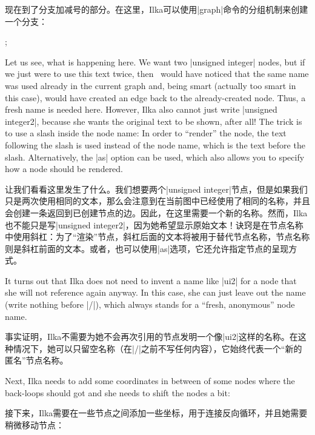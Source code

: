 现在到了分支加减号的部分。在这里，Ilka可以使用|graph|命令的分组机制来创建一个分支：

%
\begin{codeexample}[preamble={\usetikzlibrary{graphs,shapes.misc}}]
\tikz {};
\end{codeexample}
%
Let us see, what is happening here. We want two |unsigned integer| nodes, but
if we just were to use this text twice, then \tikzname\ would have noticed that
the same name was used already in the current graph and, being smart (actually
too smart in this case), would have created an edge back to the already-created
node. Thus, a fresh name is needed here. However, Ilka also cannot just write
|unsigned integer2|, because she wants the original text to be shown, after
all! The trick is to use a slash inside the node name: In order to ``render''
the node, the text following the slash is used instead of the node name, which
is the text before the slash. Alternatively, the |as| option can be used, which
also allows you to specify how a node should be rendered.

让我们看看这里发生了什么。我们想要两个|unsigned integer|节点，但是如果我们只是两次使用相同的文本，那么\tikzname 会注意到在当前图中已经使用了相同的名称，并且会创建一条返回到已创建节点的边。因此，在这里需要一个新的名称。然而，Ilka也不能只是写|unsigned integer2|，因为她希望显示原始文本！诀窍是在节点名称中使用斜杠：为了“渲染”节点，斜杠后面的文本将被用于替代节点名称，节点名称则是斜杠前面的文本。或者，也可以使用|as|选项，它还允许指定节点的呈现方式。

It turns out that Ilka does not need to invent a name like |ui2| for a node
that she will not reference again anyway. In this case, she can just leave out
the name (write nothing before |/|), which always stands for a ``fresh,
anonymous'' node name.

事实证明，Ilka不需要为她不会再次引用的节点发明一个像|ui2|这样的名称。在这种情况下，她可以只留空名称（在|/|之前不写任何内容），它始终代表一个“新的匿名”节点名称。

Next, Ilka needs to add some coordinates in between of some nodes where the
back-loops should got and she needs to shift the nodes a bit:

接下来，Ilka需要在一些节点之间添加一些坐标，用于连接反向循环，并且她需要稍微移动节点：

